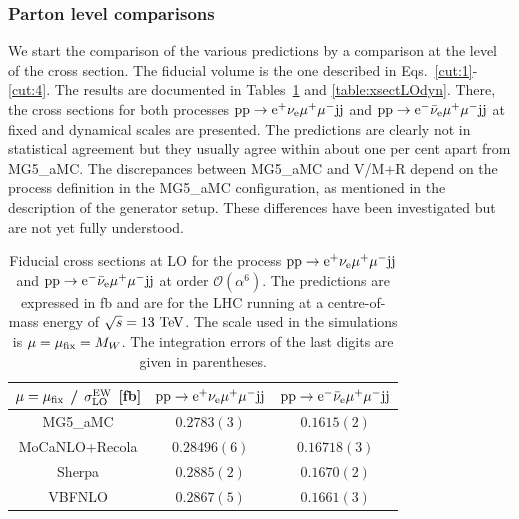 \documentclass[11pt]{cernrep}
\newcommand{\MoCaNLO}{M\protect\scalebox{0.8}{oCaNLO}\xspace}
\newcommand{\Recola}{R\protect\scalebox{0.8}{ecola}\xspace}
\newcommand{\VBFNLO}{V\protect\scalebox{0.8}{BFNLO}\xspace}
\begin{document}
\subsubsection*{Parton level comparisons}

We start the comparison of the various predictions by a comparison at the level of the cross section.
The fiducial volume is the one described in Eqs.~\eqref{cut:1}-\eqref{cut:4}.
The results are documented in Tables~\ref{table:xsectLOfix} and \ref{table:xsectLOdyn}.
There, the cross sections for both processes ${\rm p} {\rm p} \to {\rm e}^+  \nu_{\rm e}  \mu^+ \mu^- {\rm j} {\rm j}$ and ${\rm p} {\rm p} \to {\rm e}^-  \bar \nu_{\rm e}  \mu^+ \mu^- {\rm j} {\rm j}$ at fixed and dynamical scales are presented.
The predictions are clearly not in statistical agreement but they usually agree within about one per cent apart from {\sc MG5\_aMC}.
The discrepances between {\sc MG5\_aMC} and \VBFNLO /\MoCaNLO\!+\Recola depend on the process
definition in the {\sc MG5\_aMC} configuration, as mentioned in the
description of the generator setup. These differences have been investigated but are not yet fully understood.

\begin{table}
\begin{center} 
\begin{tabular}{ c | c | c }
 $\mu = \mu_{\rm fix}$ / $\sigma_{\rm LO}^{\rm EW}$ [fb] & ${\rm p} {\rm p} \to {\rm e}^+  \nu_{\rm e}  \mu^+ \mu^- {\rm j} {\rm j}$  & ${\rm p} {\rm p} \to {\rm e}^-  \bar \nu_{\rm e}  \mu^+ \mu^- {\rm j} {\rm j}$  \\
  \hline\hline
  {\sc MG5\_aMC}                  & $0.2783(3)$     & $0.1615(2)$   \\
  {\sc MoCaNLO}+{\sc Recola}      & $0.28496(6)$    & $0.16718(3)$  \\
  {\sc Sherpa}                    & $0.2885(2)$     & $0.1670(2)$   \\
  {\sc VBFNLO}                    & $0.2867(5)$     & $0.1661(3)$   \\
  \hline
\end{tabular}
\end{center}
\caption{
Fiducial cross sections at LO for the process ${\rm p}{\rm p}\to{\rm e}^+\nu_{\rm e}\mu^+\mu^-{\rm j}{\rm j}$ and ${\rm p}{\rm p}\to{\rm e}^-\bar\nu_{\rm e}\mu^+\mu^-{\rm j}{\rm j}$ at order $\mathcal{O} (\alpha^6)$.
The predictions are expressed in fb and are for the LHC running at a centre-of-mass energy of $\sqrt{s}=13 {\rm~TeV}$.
The scale used in the simulations is $\mu = \mu_{\rm fix} = M_W$.
The integration errors of the last digits are given in parentheses.}
\label{table:xsectLOfix}
\end{table}
\end{document}
